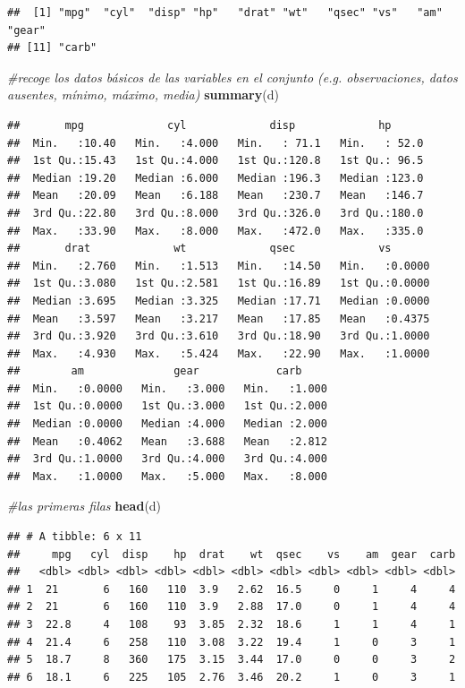 \documentclass[
]{article}
\newenvironment{Shaded}{\begin{snugshade}}{\end{snugshade}}
\newcommand{\CommentTok}[1]{\textcolor[rgb]{0.56,0.35,0.01}{\textit{#1}}}
\newcommand{\FunctionTok}[1]{\textcolor[rgb]{0.13,0.29,0.53}{\textbf{#1}}}
\newcommand{\NormalTok}[1]{#1}
\begin{document}
\begin{verbatim}
##  [1] "mpg"  "cyl"  "disp" "hp"   "drat" "wt"   "qsec" "vs"   "am"   "gear"
## [11] "carb"
\end{verbatim}

\begin{Shaded}
\begin{Highlighting}[]
\CommentTok{\#recoge los datos básicos de las variables en el conjunto (e.g. observaciones, datos ausentes, mínimo, máximo, media)}
\FunctionTok{summary}\NormalTok{(d)}
\end{Highlighting}
\end{Shaded}

\begin{verbatim}
##       mpg             cyl             disp             hp       
##  Min.   :10.40   Min.   :4.000   Min.   : 71.1   Min.   : 52.0  
##  1st Qu.:15.43   1st Qu.:4.000   1st Qu.:120.8   1st Qu.: 96.5  
##  Median :19.20   Median :6.000   Median :196.3   Median :123.0  
##  Mean   :20.09   Mean   :6.188   Mean   :230.7   Mean   :146.7  
##  3rd Qu.:22.80   3rd Qu.:8.000   3rd Qu.:326.0   3rd Qu.:180.0  
##  Max.   :33.90   Max.   :8.000   Max.   :472.0   Max.   :335.0  
##       drat             wt             qsec             vs        
##  Min.   :2.760   Min.   :1.513   Min.   :14.50   Min.   :0.0000  
##  1st Qu.:3.080   1st Qu.:2.581   1st Qu.:16.89   1st Qu.:0.0000  
##  Median :3.695   Median :3.325   Median :17.71   Median :0.0000  
##  Mean   :3.597   Mean   :3.217   Mean   :17.85   Mean   :0.4375  
##  3rd Qu.:3.920   3rd Qu.:3.610   3rd Qu.:18.90   3rd Qu.:1.0000  
##  Max.   :4.930   Max.   :5.424   Max.   :22.90   Max.   :1.0000  
##        am              gear            carb      
##  Min.   :0.0000   Min.   :3.000   Min.   :1.000  
##  1st Qu.:0.0000   1st Qu.:3.000   1st Qu.:2.000  
##  Median :0.0000   Median :4.000   Median :2.000  
##  Mean   :0.4062   Mean   :3.688   Mean   :2.812  
##  3rd Qu.:1.0000   3rd Qu.:4.000   3rd Qu.:4.000  
##  Max.   :1.0000   Max.   :5.000   Max.   :8.000
\end{verbatim}

\begin{Shaded}
\begin{Highlighting}[]
\CommentTok{\#las primeras filas}
\FunctionTok{head}\NormalTok{(d)}
\end{Highlighting}
\end{Shaded}

\begin{verbatim}
## # A tibble: 6 x 11
##     mpg   cyl  disp    hp  drat    wt  qsec    vs    am  gear  carb
##   <dbl> <dbl> <dbl> <dbl> <dbl> <dbl> <dbl> <dbl> <dbl> <dbl> <dbl>
## 1  21       6   160   110  3.9   2.62  16.5     0     1     4     4
## 2  21       6   160   110  3.9   2.88  17.0     0     1     4     4
## 3  22.8     4   108    93  3.85  2.32  18.6     1     1     4     1
## 4  21.4     6   258   110  3.08  3.22  19.4     1     0     3     1
## 5  18.7     8   360   175  3.15  3.44  17.0     0     0     3     2
## 6  18.1     6   225   105  2.76  3.46  20.2     1     0     3     1
\end{verbatim}
\end{document}
